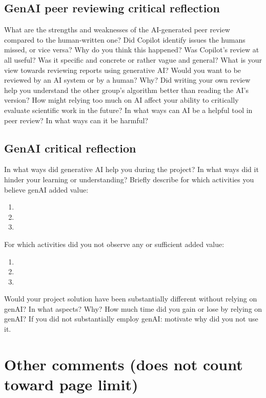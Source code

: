 \documentclass[a4paper,10pt]{article}
\newcommand{\ReplaceMe}[1]{{\color{blue}#1}}
\begin{document}
\subsection{GenAI peer reviewing critical reflection} 
\ReplaceMe{What are the strengths and weaknesses of the AI-generated peer review compared to the human-written one? Did Copilot identify issues the humans missed, or vice versa? Why do you think this happened? Was Copilot's review at all useful? Was it specific and concrete or rather vague and general? What is your view towards reviewing reports using generative AI? Would you want to be reviewed by an AI system or by a human? Why? Did writing your own review help you understand the other group's algorithm better than reading the AI’s version? How might relying too much on AI affect your ability to critically evaluate scientific work in the future? In what ways can AI be a helpful tool in peer review? In what ways can it be harmful?}

\subsection{GenAI critical reflection}
\ReplaceMe{In what ways did generative AI help you during the project? In what ways did it hinder your learning or understanding?
Briefly describe for which activities you believe genAI added value:
\begin{enumerate}
 \item 
 \item
 \item
\end{enumerate}
For which activities did you not observe any or sufficient added value:
\begin{enumerate}
 \item 
 \item
 \item
\end{enumerate}
}

\ReplaceMe{Would your project solution have been substantially different without relying on genAI? In what aspects? Why? How much time did you gain or lose by relying on genAI? If you did not substantially employ genAI: motivate why did you not use it.}


\clearpage
\section{Other comments \hfill(does not count toward page limit)} \label{sec_other}
\end{document}
